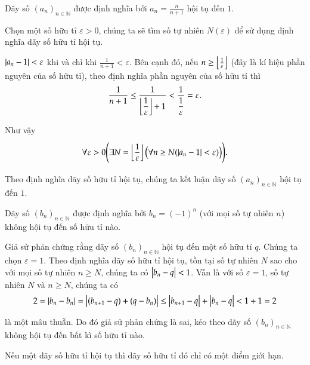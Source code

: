 \begin{example}
    Dãy số ${(a_{n})}_{n\in\mathbb{N}}$ được định nghĩa bởi $a_{n} = \frac{n}{n+1}$ hội tụ đến $1$.

    Chọn một số hữu tỉ $\varepsilon > 0$, chúng ta sẽ tìm số tự nhiên $N(\varepsilon)$ để sử dụng định nghĩa dãy số hữu tỉ hội tụ.

    $\left\vert{a_{n} - 1}\right\vert < \varepsilon$ khi và chỉ khi $\frac{1}{n+1} < \varepsilon$. Bên cạnh đó, nếu $n \geq \left\lfloor{\frac{1}{\varepsilon}}\right\rfloor$ (đây là kí hiệu phần nguyên của số hữu tỉ), theo định nghĩa phần nguyên của số hữu tỉ thì
    \[
        \frac{1}{n+1}\leq \frac{1}{\left\lfloor{\dfrac{1}{\varepsilon}}\right\rfloor + 1} < \frac{1}{\dfrac{1}{\varepsilon}} = \varepsilon.
    \]

    Như vậy
    \[
        \forall\varepsilon > 0 \Biggl( \exists N=\left\lfloor{\frac{1}{\varepsilon}}\right\rfloor\bigl(\forall n\geq N ( \left\vert{a_{n} - 1}\right\vert < \varepsilon )\bigr) \Biggr).
    \]

    Theo định nghĩa dãy số hữu tỉ hội tụ, chúng ta kết luận dãy số ${(a_{n})}_{n\in\mathbb{N}}$ hội tụ đến $1$.
\end{example}

\begin{counterexample}
    Dãy số ${(b_{n})}_{n\in\mathbb{N}}$ được định nghĩa bởi $b_{n} = {(-1)}^{n}$ (với mọi số tự nhiên $n$) không hội tụ đến số hữu tỉ nào.

    Giả sử phản chứng rằng dãy số ${(b_{n})}_{n\in\mathbb{N}}$ hội tụ đến một số hữu tỉ $q$. Chúng ta chọn $\varepsilon = 1$. Theo định nghĩa dãy số hữu tỉ hội tụ, tồn tại số tự nhiên $N$ sao cho với mọi số tự nhiên $n\geq N$, chúng ta có $\left\vert{b_{n} - q}\right\vert < 1$. Vẫn là với số $\varepsilon = 1$, số tự nhiên $N$ và $n\ge N$, chúng ta có
    \[
        2 = \left\vert{b_{n} - b_{n}}\right\vert = \left\vert{(b_{n+1} - q) + (q - b_{n})}\right\vert \leq \left\vert{b_{n+1} - q}\right\vert + \left\vert{b_{n} - q}\right\vert < 1 + 1 = 2
    \]

    là một mâu thuẫn. Do đó giả sử phản chứng là sai, kéo theo dãy số ${(b_{n})}_{n\in\mathbb{N}}$ không hội tụ đến bất kì số hữu tỉ nào.
\end{counterexample}

\begin{appendixthm}\label{appendixthm:uniqueness-of-limit-points-of-convergence-rational-sequences}
    Nếu một dãy số hữu tỉ hội tụ thì dãy số hữu tỉ đó chỉ có một điểm giới hạn.
\end{appendixthm}


